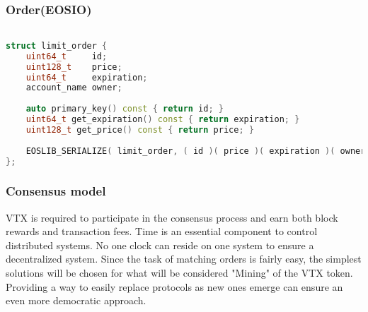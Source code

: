 \documentclass[]{article}
\begin{document}
\subsubsection{Order(EOSIO)}
\begin{lstlisting}[language=C++, caption={C++ code using listings}]

struct limit_order {
	uint64_t     id;
	uint128_t    price;
	uint64_t     expiration;
	account_name owner;
	
	auto primary_key() const { return id; }
	uint64_t get_expiration() const { return expiration; }
	uint128_t get_price() const { return price; }
	
	EOSLIB_SERIALIZE( limit_order, ( id )( price )( expiration )( owner ) )
};

\end{lstlisting}

\subsubsection{Consensus model}
VTX is required to participate in the consensus process and earn both block rewards and transaction fees. 
Time is an essential component to control distributed systems.
No one clock can reside on one system to ensure a decentralized system.
Since the task of matching orders is fairly easy, the simplest 
solutions will be chosen for what will be considered "Mining" of the VTX token.
Providing a way to easily replace protocols as new ones emerge can ensure
an even more democratic approach.
\end{document}
